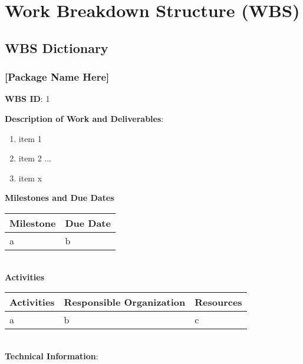 \clearpage
\section {Work Breakdown Structure (WBS)}

\subsection {WBS Dictionary}


\def \wbsPackageName {[Package Name Here]}
\def \wbsPackageID {1}
\subsubsection {\wbsPackageName}


\textbf{WBS ID}: \wbsPackageID


\textbf{Description of Work and Deliverables}:
\begin {enumerate}
	\item item 1
	\item item 2
	...
	\item item x
\end {enumerate}

\textbf{Milestones and Due Dates}

\begin {tabular} {l | l}
Milestone & Due Date \\ \hline
a & b\\
\end {tabular}\\

\textbf{Activities}

\begin {tabular} {l | l | l}
Activities & Responsible Organization & Resources \\ \hline
a & b & c\\
\end {tabular}\\


\textbf{Technical Information}:

